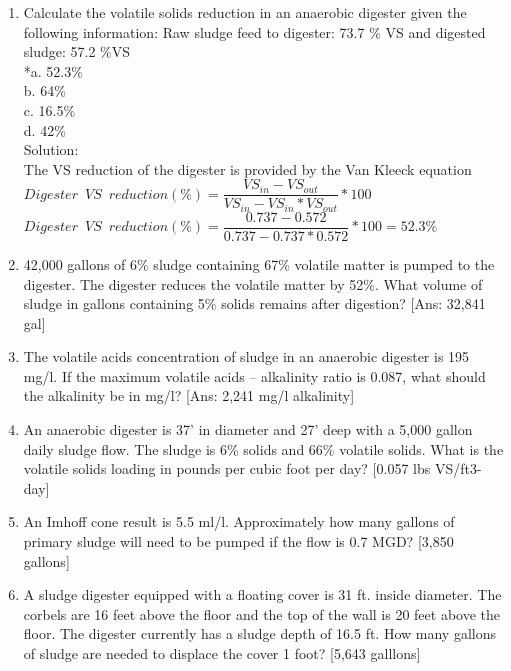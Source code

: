 \documentclass{article}
\begin{document}
\begin{enumerate}
\item Calculate the volatile solids reduction in an anaerobic digester given the following information: Raw sludge feed to digester: 73.7 \% VS and digested sludge: 57.2 \%VS\\

*a. 52.3\% \\
b. 64\%\\
c. 16.5\% \\
d. 42\% \\
\vspace{0.5cm}
Solution:\\
\vspace{0.5cm}  
The VS reduction of the digester is provided by the Van Kleeck equation \\ 
\vspace{0.5cm}
$Digester \enspace VS \enspace reduction (\%)=\dfrac{VS_{in}-VS_{out}}{VS_{in}-VS_{in}*VS_{out}}*100$\\
\vspace{0.5cm}
$Digester \enspace VS \enspace reduction (\%)=\dfrac{0.737-0.572}{0.737-0.737*0.572}*100=\boxed{ 52.3\%}$\\





\item 42,000 gallons of 6\% sludge containing 67\% volatile matter is pumped to the digester.  The digester reduces the volatile matter by 52\%.  What volume of sludge in gallons containing 5\% solids remains after digestion? [Ans:  32,841 gal]


\item The volatile acids concentration of sludge in an anaerobic digester is 195 mg/l.  If the maximum volatile acids – alkalinity ratio is 0.087, what should the alkalinity be in mg/l? [Ans: 2,241 mg/l alkalinity]


\item An anaerobic digester is 37’ in diameter and 27’ deep with a 5,000 gallon daily sludge flow. The sludge is 6\% solids and 66\% volatile solids.  What is the volatile solids loading in pounds per cubic foot per day? [0.057 lbs VS/ft3-day]

\item An Imhoff cone result is 5.5 ml/l.  Approximately how many gallons of primary sludge will need to be pumped if the flow is 0.7 MGD? [3,850 gallons]

\item A sludge digester equipped with a floating cover is 31 ft. inside diameter.  The corbels are 16 feet above the floor and the top of the wall is 20 feet above the floor.  The digester currently has a sludge depth of 16.5 ft. How many gallons of sludge are needed to displace the cover 1 foot? [5,643 galllons]


\end{enumerate}
\end{document}
